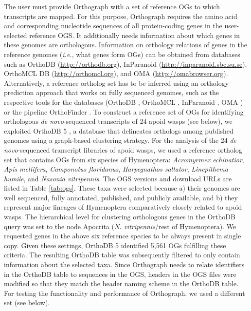 The user must provide Orthograph with a set of reference OGs to which
transcripts are mapped. For this purpose, Orthograph requires the amino
acid and corresponding nucleotide sequences of all protein-coding genes
in the user-selected reference OGS. It additionally needs information
about which genes in these genomes are orthologous. Information on
orthology relations of genes in the reference genomes (\emph{i.e.}, what
genes form OGs) can be obtained from databases such as OrthoDB
(\url{http://orthodb.org}), InParanoid
(\url{http://inparanoid.sbc.su.se}), OrthoMCL DB
(\url{http://orthomcl.org}), and OMA (\url{http://omabrowser.org}).
Alternatively, a reference ortholog set has to be inferred using an
orthology prediction approach that works on fully sequenced genomes,
such as the respective tools for the databases (OrthoDB
\citep{Kriventseva2015}, OrthoMCL \citep{Li2003}, InParanoid
\citep{Sonnhammer2015}, OMA \citep{Altenhoff2015}) or the pipeline
OrthoFinder \citep{Emms2015}. To construct a reference set of OGs for
identifying orthologous \emph{de novo}-sequenced transcripts of 24 apoid
wasps (see below), we exploited OrthoDB 5 \citep{Waterhouse2011}, a
database that delineates orthologs among published genomes using a
graph-based clustering strategy. For the analysis of the 24 \emph{de
novo}-sequenced transcript libraries of apoid wasps, we used a reference
ortholog set that contains OGs from six species of Hymenoptera:
\emph{Acromyrmex echinatior}, \emph{Apis mellifera}, \emph{Camponotus
floridanus}, \emph{Harpegnathos saltator}, \emph{Linepithema humile},
and \emph{Nasonia vitripennis}. The OGS versions and download URLs are
listed in Table \ref{tab:ogs}. These taxa were selected because a) their genomes
are well sequenced, fully annotated, published, and publicly available,
and b) they represent major lineages of Hymenoptera comparatively
closely related to apoid wasps. The hierarchical level for clustering
orthologous genes in the OrthoDB query was set to the node Apocrita
(\emph{N. vitripennis}/rest of Hymenoptera). We requested genes in the
above six reference species to be always present in single copy. Given
these settings, OrthoDB 5 identified 5,561 OGs fulfilling these
criteria. The resulting OrthoDB table was subsequently filtered to only
contain information about the selected taxa. Since Orthograph needs to
relate identifiers in the OrthoDB table to sequences in the OGS, headers
in the OGS files were modified so that they match the header naming
scheme in the OrthoDB table. For testing the functionality and
performance of Orthograph, we used a different set (see below).

